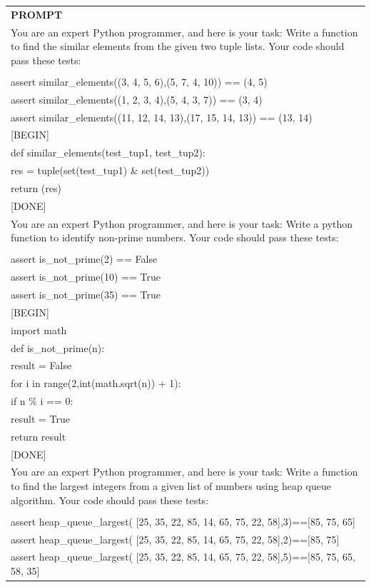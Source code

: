 \begin{table}[h]
    \centering \small
\begin{tabular}{p{12cm}}
\toprule
\textbf{PROMPT}\\
You are an expert Python programmer, and here is your task: Write a function to find the similar elements from the given two tuple lists. Your code should pass these tests:\\
\\
assert similar\_elements((3, 4, 5, 6),(5, 7, 4, 10)) == (4, 5)\\
assert similar\_elements((1, 2, 3, 4),(5, 4, 3, 7)) == (3, 4)\\
assert similar\_elements((11, 12, 14, 13),(17, 15, 14, 13)) == (13, 14)\\

[BEGIN]\\
def similar\_elements(test\_tup1, test\_tup2):\\
  res = tuple(set(test\_tup1) \& set(test\_tup2))\\
  return (res) \\

[DONE]\\
You are an expert Python programmer, and here is your task: Write a python function to identify non-prime numbers. Your code should pass these tests:\\
\\
assert is\_not\_prime(2) == False\\
assert is\_not\_prime(10) == True\\
assert is\_not\_prime(35) == True\\

[BEGIN]\\
import math\\
def is\_not\_prime(n):\\
    result = False\\
    for i in range(2,int(math.sqrt(n)) + 1):\\
        if n \% i == 0:\\
            result = True\\
    return result\\

[DONE]\\
You are an expert Python programmer, and here is your task: Write a function to find the largest integers from a given list of numbers using heap queue algorithm. Your code should pass these tests:\\
\\
assert heap\_queue\_largest( [25, 35, 22, 85, 14, 65, 75, 22, 58],3)==[85, 75, 65] \\
assert heap\_queue\_largest( [25, 35, 22, 85, 14, 65, 75, 22, 58],2)==[85, 75] \\
assert heap\_queue\_largest( [25, 35, 22, 85, 14, 65, 75, 22, 58],5)==[85, 75, 65, 58, 35]\\


\end{tabular}
\end{table}
